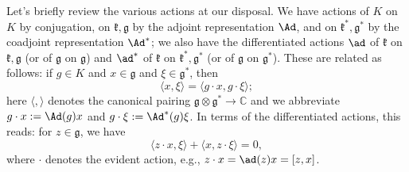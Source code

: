 \documentclass[reqno]{amsart} 
\begin{document}
Let's briefly review the various actions at our disposal.  We have actions of $K$ on $K$ by conjugation, on $\mathfrak{k}, \mathfrak{g}$ by the adjoint representation $\Ad$, and on $\mathfrak{k}^*, \mathfrak{g}^*$ by the coadjoint representation $\Ad^*$; we also have the differentiated actions $\ad$ of $\mathfrak{k}$ on $\mathfrak{k}, \mathfrak{g}$ (or of $\mathfrak{g}$ on $\mathfrak{g}$) and $\ad^*$ of $\mathfrak{k}$ on $\mathfrak{k}^*, \mathfrak{g}^*$ (or of $\mathfrak{g}$ on $\mathfrak{g}^*$).  These are related as follows: if $g \in K$ and $x \in \mathfrak{g}$ and $\xi \in \mathfrak{g}^*$, then
\begin{equation*}
  \langle x, \xi \rangle = \langle g \cdot x, g \cdot \xi \rangle;
\end{equation*}
 here $\langle , \rangle$ denotes the canonical pairing $\mathfrak{g} \otimes \mathfrak{g}^* \rightarrow \mathbb{C}$ and we abbreviate $g \cdot x := \Ad(g) x$ and $g \cdot \xi := \Ad^*(g) \xi$.  In terms of the differentiated actions, this reads: for $z \in \mathfrak{g}$, we have
\begin{equation*}
\langle z \cdot x, \xi \rangle + \langle x, z \cdot \xi \rangle
  = 0,
\end{equation*}
 where $\cdot$ denotes the evident action, e.g., $z \cdot x = \ad(z) x = [z,x]$.
\end{document}
